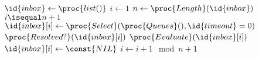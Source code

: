 \begin{codebox}
	\li \(\id{inbox} \gets \proc{list()}\)
	\li \(i \gets 1\)
	\li \Repeat
	\li \(n \gets \proc{Length}(\id{inbox})\)
	\li \If \(i \isequal n + 1\)
	\li \Then
	\(\id{inbox}[i] \gets \proc{Select}(\proc{Queues}(), \id{timeout}=0)\)
	\End
	\li \If \(\proc{Resolved?}(\id{inbox}[i])\)
	\li \Then
	\(\proc{Evaluate}(\id{inbox}[i])\)
	\li \(\id{inbox}[i] \gets \const{NIL}\)
	\End
	\li \(i \gets i + 1 \mod n + 1\)
	\End
\end{codebox}
